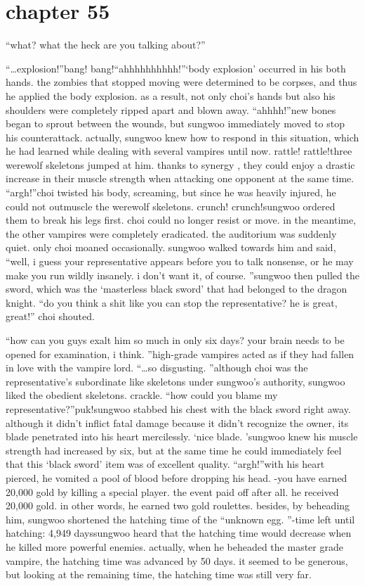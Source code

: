 \section{chapter 55}

                            “what? what the heck are you talking about?”




“…explosion!”bang! bang!“ahhhhhhhhhh!”‘body explosion’ occurred in his both hands.
 the zombies that stopped moving were determined to be corpses, and thus he applied the body explosion.
 as a result, not only choi’s hands but also his shoulders were completely ripped apart and blown away.
“ahhhh!”new bones began to sprout between the wounds, but sungwoo immediately moved to stop his counterattack.
 actually, sungwoo knew how to respond in this situation, which he had learned while dealing with several vampires until now.
rattle! rattle!three werewolf skeletons jumped at him.
 thanks to synergy , they could enjoy a drastic increase in their muscle strength when attacking one opponent at the same time.
“argh!”choi twisted his body, screaming, but since he was heavily injured, he could not outmuscle the werewolf skeletons.
crunch! crunch!sungwoo ordered them to break his legs first.
 choi could no longer resist or move.
in the meantime, the other vampires were completely eradicated.
 the auditorium was suddenly quiet.
 only choi moaned occasionally.
sungwoo walked towards him and said, “well, i guess your representative appears before you to talk nonsense, or he may make you run wildly insanely.
 i don’t want it, of course.
”sungwoo then pulled the sword, which was the ‘masterless black sword’ that had belonged to the dragon knight.
“do you think a shit like you can stop the representative? he is great, great!” choi shouted.

“how can you guys exalt him so much in only six days? your brain needs to be opened for examination, i think.
”high-grade vampires acted as if they had fallen in love with the vampire lord.
“…so disgusting.
”although choi was the representative’s subordinate like skeletons under sungwoo’s authority, sungwoo liked the obedient skeletons.
crackle.
“how could you blame my representative?”puk!sungwoo stabbed his chest with the black sword right away.
 although it didn’t inflict fatal damage because it didn’t recognize the owner, its blade penetrated into his heart mercilessly.
‘nice blade.
’sungwoo knew his muscle strength had increased by six, but at the same time he could immediately feel that this ‘black sword’ item was of excellent quality.
“argh!”with his heart pierced, he vomited a pool of blood before dropping his head.
-you have earned 20,000 gold by killing a special player.
the event paid off after all.
 he received 20,000 gold.
 in other words, he earned two gold roulettes.
 besides, by beheading him, sungwoo shortened the hatching time of the “unknown egg.
”-time left until hatching: 4,949 dayssungwoo heard that the hatching time would decrease when he killed more powerful enemies.
 actually, when he beheaded the master grade vampire, the hatching time was advanced by 50 days.
 it seemed to be generous, but looking at the remaining time, the hatching time was still very far.

